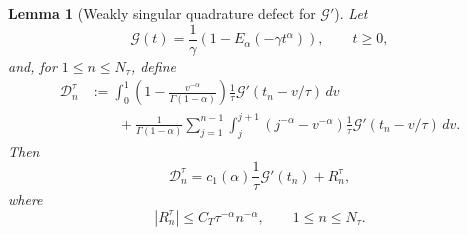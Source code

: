 \documentclass[letterpaper]{article}
\numberwithin{equation}{section}
\newtheorem{lemma}[theorem]{Lemma}
\theoremstyle{definition}
\theoremstyle{remark}
\begin{document}
\begin{lemma}[Weakly singular quadrature defect for $\mathcal G'$]
\label{lem:quadrature-defect-Gprime}
Let
\[
  \mathcal G(t)=\frac1\gamma\left(1-E_\alpha(-\gamma t^\alpha)\right),
  \qquad t\ge0,
\]
and, for $1\le n\le N_\tau$, define
\begin{equation}\label{eq:Dn-def}
\begin{aligned}
  \mathcal D_n^\tau
  &:=
  \int_0^1\left(1-\frac{v^{-\alpha}}{\Gamma(1-\alpha)}\right)
  \frac1\tau \mathcal G'(t_n-v/\tau)\,dv
\\
  &\qquad
  +
  \frac1{\Gamma(1-\alpha)}
  \sum_{j=1}^{n-1}\int_j^{j+1}(j^{-\alpha}-v^{-\alpha})
  \frac1\tau \mathcal G'(t_n-v/\tau)\,dv .
\end{aligned}
\end{equation}
Then
\begin{equation}\label{eq:quadrature-defect-main}
  \mathcal D_n^\tau
  =
  c_1(\alpha)\frac1\tau \mathcal G'(t_n)+R_n^\tau,
\end{equation}
where
\begin{equation}\label{eq:Rn-bound}
  |R_n^\tau|\le C_T\tau^{-\alpha}n^{-\alpha},
  \qquad 1\le n\le N_\tau.
\end{equation}
\end{lemma}
\end{document}
